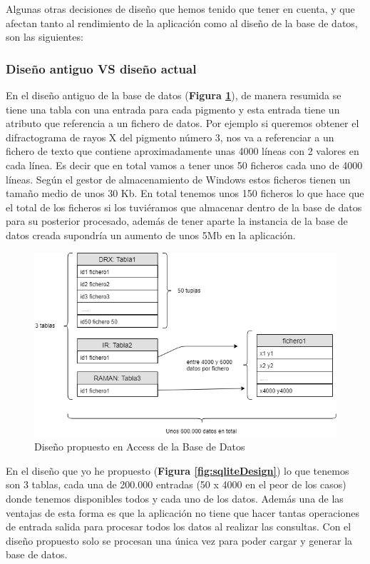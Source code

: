 Algunas otras decisiones de diseño que hemos tenido que tener en cuenta, y que afectan tanto al rendimiento de la aplicación como al diseño de la base de datos, son las siguientes:

\subsubsection{Diseño antiguo VS diseño actual}
En el diseño antiguo de la base de datos (\textbf{Figura \ref{fig:accessDesign}}), de manera resumida se tiene una tabla con una entrada para cada pigmento y esta entrada tiene un atributo que referencia a un fichero de datos. Por ejemplo si queremos obtener el difractograma de rayos X del pigmento número 3, nos va a referenciar a un fichero de texto que contiene aproximadamente unas 4000 líneas con 2 valores en cada línea. Es decir que en total vamos a tener unos 50 ficheros cada uno de 4000 líneas. Según el gestor de almacenamiento de Windows estos ficheros tienen un tamaño medio de unos 30 Kb. En total tenemos unos 150 ficheros lo que hace que el total de los ficheros si los tuviéramos que almacenar dentro de la base de datos para su posterior procesado, además de tener aparte la instancia de la base de datos creada supondría un aumento de unos 5Mb en la aplicación.

\begin{figure}[H]
    \centering
    \includegraphics[scale=0.75]{imagenes/disenoBaseDatos/accessDesign.png}
    \caption{Diseño propuesto en Access de la Base de Datos}
    \label{fig:accessDesign}
\end{figure}

En el diseño que yo he propuesto (\textbf{Figura \ref{fig:sqliteDesign}}) lo que tenemos son 3 tablas, cada una de 200.000 entradas (50 x 4000 en el peor de los casos) donde tenemos disponibles todos y cada uno de los datos. Además una de las ventajas de esta forma es que la aplicación no tiene que hacer tantas operaciones de entrada salida para procesar todos los datos al realizar las consultas. Con el diseño propuesto solo se procesan una única vez para poder cargar y generar la base de datos. 

